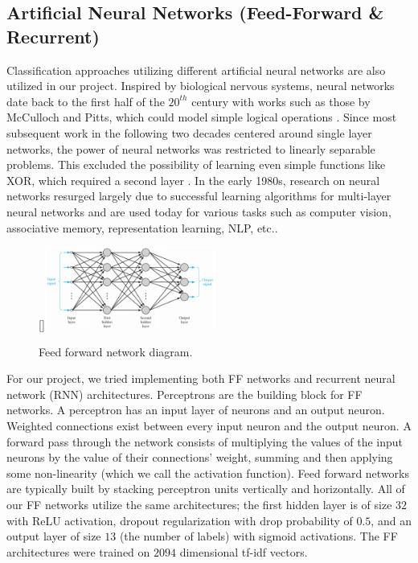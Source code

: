 \documentclass[11pt]{article}
\begin{document}
\subsection{Artificial Neural Networks (Feed-Forward \& Recurrent)}
Classification approaches utilizing different artificial neural networks are also utilized in our project. Inspired by biological nervous systems, neural networks date back to the first half of the $20^{th}$ century with works such as those by McCulloch and Pitts, which could model simple logical operations \autocite{Piccinini}. Since most subsequent work in the following two decades centered around single layer networks, the power of neural networks was restricted to linearly separable problems. This excluded the possibility of learning even simple functions like XOR, which required a second layer \autocite{NNLM}. In the early 1980s, research on neural networks resurged largely due to successful learning algorithms for multi-layer neural networks and are used today for various tasks such as computer vision, associative memory, representation learning, NLP, etc..

\begin{figure}
    \begin{center}
        \raisebox{0pt}[\dimexpr{}\baselineskip\relax]{\includegraphics[width=0.5\textwidth]{multilayer_network_Haykin.png}}
        \caption{Feed forward network diagram.}
    \end{center}
\end{figure}

For our project, we tried implementing both FF networks and recurrent neural network (RNN) architectures. Perceptrons are the building block for FF networks. A perceptron has an input layer of neurons and an output neuron. Weighted connections exist between every input neuron and the output neuron. A forward pass through the network consists of multiplying the values of the input neurons by the value of their connections' weight, summing and then applying some non-linearity (which we call the activation function). Feed forward networks are typically built by stacking perceptron units vertically and horizontally. All of our FF networks utilize the same architectures; the first hidden layer is of size $32$ with ReLU activation, dropout regularization with drop probability of $0.5$, and an output layer of size $13$ (the number of labels) with sigmoid activations. The FF architectures were trained on $2094$ dimensional tf-idf vectors. 
\end{document}
